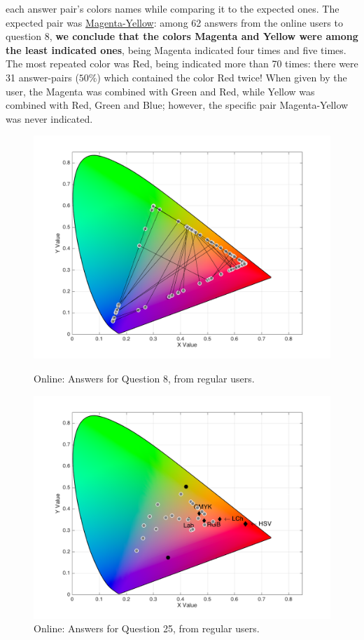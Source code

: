 each answer pair's colors names while comparing it to the expected ones. The expected pair was \ul{Magenta-Yellow}: among
62 answers from the online users to question 8, \textbf{we conclude that the colors Magenta and Yellow were among the least
indicated ones}, being Magenta indicated four times and five times. The most repeated color was Red, being indicated more than
70 times: there were 31 answer-pairs ($50\%$) which contained the color Red twice! When given by the user, the Magenta was combined
with Green and Red, while Yellow was combined with Red, Green and Blue; however, the specific pair Magenta-Yellow was never indicated.
%
\begin{figure}[!htbp]
  \centering
  \begin{minipage}{0.48\textwidth}
    \centering
    \includegraphics[width=\textwidth]{images/results/8_online_regularUsers.png}
    \caption[Online: Answers for Question 8, from regular users.]{Online: Answers for Question 8, from regular users.}
    \label{fig:redblend_1}
  \end{minipage}\hfill
  \begin{minipage}{0.48\textwidth}
    \centering
    \includegraphics[width=\textwidth]{images/results/25_online_regularUsers.png}
    \caption[Online: Answers for Question 25, from regular users.]{Online: Answers for Question 25, from regular users.}
    \label{fig:redblend_2}
  \end{minipage}
\end{figure}
%
